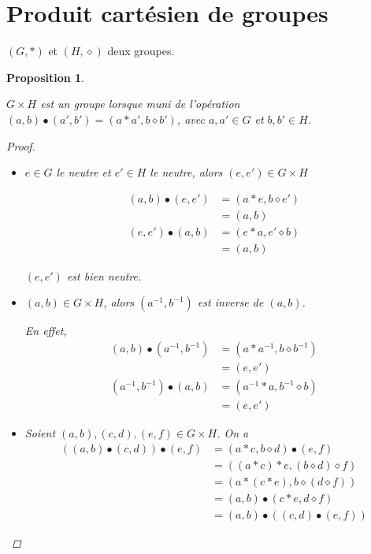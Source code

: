 \documentclass{report}
\newtheorem*{prop}{Proposition}
\theoremstyle{definition}
\theoremstyle{remark}
\begin{document}
	
	\section*{Produit cart\'esien de groupes}
	$(G, *)$ et $(H, \diamond)$ deux groupes.

	\begin{prop}
		~

		$G \times H$ est un groupe lorsque muni de l'op\'eration $(a,b) \bullet (a',b') = (a*a',b \diamond b')$, avec $a,a' \in G$ et $b,b' \in H$.
		\begin{proof}~

			\begin{itemize}
				\item[(N)] $e \in G$ le neutre et $e' \in H$ le neutre, alors $(e,e') \in G \times H$

				\begin{align*}
					(a,b) \bullet (e,e')&= (a*e, b \diamond e')\\
					&= (a,b)\\
					(e,e') \bullet (a,b)&= (e*a, e' \diamond b)\\
					&= (a,b)
				\end{align*}

				$(e,e')$ est bien neutre.
				\item[(I)] $(a,b) \in G \times H$, alors $(a^{-1},b^{-1})$ est inverse de $(a,b)$.

				En effet,
				\begin{align*}
					(a,b) \bullet (a^{-1},b^{-1})&= (a*a^{-1},b \diamond b^{-1})\\
					&= (e,e')\\
					(a^{-1},b^{-1}) \bullet (a,b)&= (a^{-1}*a,b^{-1} \diamond b)\\
					&= (e,e')
				\end{align*}
				\item[(A)] Soient $(a,b), (c,d), (e,f) \in G \times H$. On a
				\begin{align*}
					((a,b) \bullet (c,d)) \bullet (e,f)&= (a*c,b \diamond d) \bullet (e,f)\\
					&= ((a*c)*e,(b \diamond d) \diamond f)\\
					&= (a*(c*e),b \diamond (d \diamond f))\\
					&= (a,b) \bullet (c*e,d \diamond f)\\
					&= (a,b) \bullet ((c,d) \bullet (e,f))
				\end{align*}
			\end{itemize}
		\end{proof}
	\end{prop}
\end{document}
